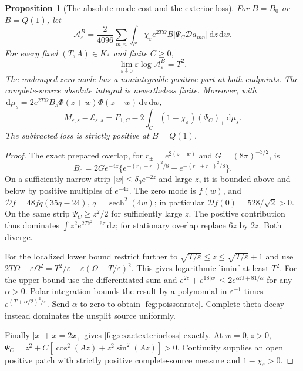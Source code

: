 \documentclass[11pt]{article}
\numberwithin{equation}{section}
\newtheorem{proposition}[theorem]{Proposition}
\newcommand{\dd}{\,\mathrm d}
\begin{document}
\begin{proposition}[The absolute mode cost and the exterior loss]
\label{fcg:poissoncost}
For $B=B_0$ or $B=Q(1)$, let
\[
 \mathcal A_\varepsilon^B=\frac2{4096}\sum_{m,n}
  \int_{\mathcal C}\chi_\varepsilon e^{2T\Omega}B
                    |\Psi_C\mathcal Da_{mn}|\dd z\dd w.
\]
For every fixed $(T,A)\in K_*$ and finite $C\ge0$,
\begin{equation}\label{fcg:poissonrate}
 \lim_{\varepsilon\downarrow0}
             \varepsilon\log\mathcal A_\varepsilon^B=T^2.
\end{equation}
The undamped zero mode has a nonintegrable positive part at both
endpoints. The complete-source absolute integral is nevertheless finite.
Moreover, with
$\dd\mu_s=2e^{2T\Omega}B_s\Phi(z+w)\Phi(z-w)\dd z\dd w$,
\begin{equation}\label{fcg:exactexteriorloss}
 M_{\varepsilon,s}-\mathcal E_{\varepsilon,s}
 =F_{1,C}-2\int_{\mathcal C}(1-\chi_\varepsilon)(\Psi_C)_+\dd\mu_s.
\end{equation}
The subtracted loss is strictly positive at $B=Q(1)$.
\end{proposition}
\begin{proof}
The exact prepared overlap, for $r_\pm=e^{2(z\pm w)}$ and
$G=(8\pi)^{-3/2}$, is
\[
 B_0=2Ge^{-4z}\{e^{-(r_+-r_-)^2/8}-e^{-(r_++r_-)^2/8}\}.
\]
On a sufficiently narrow strip $|w|\le\delta_0e^{-2z}$ and large $z$,
it is bounded above and below by positive multiples of $e^{-4z}$.
The zero mode is $f(w)$, and
$\mathcal Df=48fq(35q-24)$, $q=\operatorname{sech}^2(4w)$;
in particular $\mathcal Df(0)=528/\sqrt2>0$.
On the same strip $\Psi_C\ge z^2/2$ for sufficiently large $z$.
The positive contribution thus dominates
$\int z^2e^{2Tz^2-6z}\dd z$; for stationary overlap replace $6z$
by $2z$. Both diverge.

For the localized lower bound restrict further to
$\sqrt{T/\varepsilon}\le z\le\sqrt{T/\varepsilon}+1$ and use
$2T\Omega-\varepsilon\Omega^2
=T^2/\varepsilon-\varepsilon(\Omega-T/\varepsilon)^2$.
This gives logarithmic liminf at least $T^2$.
For the upper bound use the differentiated sum and
$e^{2z}+e^{18|w|}\le2e^{\alpha\Omega+81/\alpha}$ for any
$\alpha>0$. Polar integration bounds the result by a polynomial in
$\varepsilon^{-1}$ times $e^{(T+\alpha/2)^2/\varepsilon}$.
Send $\alpha$ to zero to obtain \eqref{fcg:poissonrate}.
Complete theta decay instead dominates the unsplit source uniformly.

Finally $|x|+x=2x_+$ gives \eqref{fcg:exactexteriorloss} exactly.
At $w=0,z>0$,
$\Psi_C=z^2+C[\cos^2(Az)+z^2\sin^2(Az)]>0$.
Continuity supplies an open positive patch with strictly positive
complete-source measure and $1-\chi_\varepsilon>0$.
\end{proof}
\end{document}
